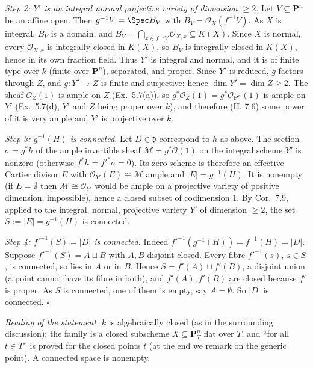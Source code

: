 \documentclass[11pt]{article}
\begin{document}
\emph{Step 2: $Y'$ is an integral normal projective variety of dimension $\ge2$.} Let $V\subseteq\mathbf P^n$ be an affine open. Then $g^{-1}V=\Spec B_V$ with $B_V=\mathcal O_X(f^{-1}V)$. As $X$ is integral, $B_V$ is a domain, and $B_V=\bigcap_{x\in f^{-1}V}\mathcal O_{X,x}\subseteq K(X)$. Since $X$ is normal, every $\mathcal O_{X,x}$ is integrally closed in $K(X)$, so $B_V$ is integrally closed in $K(X)$, hence in its own fraction field. Thus $Y'$ is integral and normal, and it is of finite type over $k$ (finite over $\mathbf P^n$), separated, and proper. Since $Y'$ is reduced, $g$ factors through $Z$, and $g\colon Y'\to Z$ is finite and surjective; hence $\dim Y'=\dim Z\ge2$. The sheaf $\mathcal O_Z(1)$ is ample on $Z$ (Ex.~5.7(a)), so $g^*\mathcal O_Z(1)=g^*\mathcal O_{\mathbf P^n}(1)$ is ample on $Y'$ (Ex.~5.7(d), $Y'$ and $Z$ being proper over $k$), and therefore (II, 7.6) some power of it is very ample and $Y'$ is projective over $k$.

\emph{Step 3: $g^{-1}(H)$ is connected.} Let $D\in\mathfrak d$ correspond to $h$ as above. The section $\sigma=g^*h$ of the ample invertible sheaf $\mathcal M=g^*\mathcal O(1)$ on the integral scheme $Y'$ is nonzero (otherwise $f^*h=f'^*\sigma=0$). Its zero scheme is therefore an effective Cartier divisor $E$ with $\mathcal O_{Y'}(E)\cong\mathcal M$ ample and $|E|=g^{-1}(H)$. It is nonempty (if $E=\emptyset$ then $\mathcal M\cong\mathcal O_{Y'}$ would be ample on a projective variety of positive dimension, impossible), hence a closed subset of codimension $1$. By Cor.~7.9, applied to the integral, normal, projective variety $Y'$ of dimension $\ge2$, the set $S:=|E|=g^{-1}(H)$ is connected.

\emph{Step 4: $f'^{-1}(S)=|D|$ is connected.} Indeed $f'^{-1}(g^{-1}(H))=f^{-1}(H)=|D|$. Suppose $f'^{-1}(S)=A\sqcup B$ with $A,B$ disjoint closed. Every fibre $f'^{-1}(s)$, $s\in S$, is connected, so lies in $A$ or in $B$. Hence $S=f'(A)\sqcup f'(B)$, a disjoint union (a point cannot have its fibre in both), and $f'(A),f'(B)$ are closed because $f'$ is proper. As $S$ is connected, one of them is empty, say $A=\emptyset$. So $|D|$ is connected. \hfill$\square$

\pf
\emph{Reading of the statement.} $k$ is algebraically closed (as in the surrounding discussion); the family is a closed subscheme $X\subseteq\mathbf P^n_T$ flat over $T$, and ``for all $t\in T$'' is proved for the closed points $t$ (at the end we remark on the generic point). A connected space is nonempty.
\end{document}

